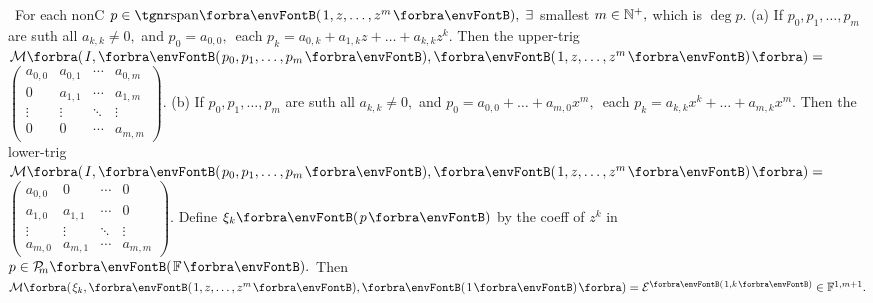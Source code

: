 \BulletPointX{} \,\,\,For each nonC $p\in\Span{1,z,\dots,z^m},\;\exists$ smallest $m\in{\mathbb{N}^+},$ which is $\deg p.$\TextB{}
(a) If $p_0,p_1,\dots,p_m$ are suth all $a_{k,k}\neq 0,$ and\TextB{}
\Hb $p_0=a_{0,0},\,$ each $p_k=a_{0,k}+a_{1,k}z+\dots+a_{k,k}z^k.$\TextB{\vspace{-18pt}}
\Ha Then the upper-trig $\Mt[\BigBigPar]{I,\Par{p_0,p_1,\dots,p_m},\Par{1,z,\dots,z^m}}={}${\small$\begin{pmatrix}
		a_{0,0} & a_{0,1} & \cdots & a_{0,m}\\
		0       & a_{1,1} & \cdots & a_{1,m}\\
		\vdots  & \vdots  & \ddots & \vdots\\
		0       & 0       & \cdots & a_{m,m}
	\end{pmatrix}$}.\TextB{\vspace{-8pt}}
(b) If $p_0,p_1,\dots,p_m$ are suth all $a_{k,k}\neq 0,$ and\TextB{}
\Hb $p_0=a_{0,0}+\dots+a_{m,0}x^m,\,$ each $p_k=a_{k,k}x^k+\dots+a_{m,k}x^m.$\TextB{\vspace{-18pt}}
\Hb Then the lower-trig \;$\Mt[\BigBigPar]{I,\Par{p_0,p_1,\dots,p_m},\Par{1,z,\dots,z^m}}={}${\small$\begin{pmatrix}
		a_{0,0} & 0       & \cdots & 0\\
		a_{1,0} & a_{1,1} & \cdots & 0\\
		\vdots  & \vdots  & \ddots & \vdots\\
		a_{m,0} & a_{m,1} & \cdots & a_{m,m}
	\end{pmatrix}$}.\TextB{\vspace{-12pt}}
\AComm Define $\xi_k\Par{p}$ by the coeff of $z^k$ in $p\in\PoF{m}.$\parCom\IndentB{}
Then $\Mt[\BigBigPar]{\xi_k,\Par{1,z,\dots,z^m},\Par{1}}=\mEnt{1,k}\in\Fbb^{1,m+1}.$\vspace{-2pt}
\SepLine\pagebreak

